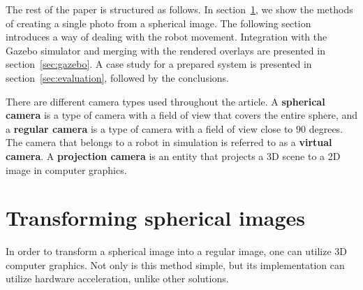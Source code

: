\documentclass{svproc}
\begin{document}
The rest of the paper is structured as follows. In section~\ref{sec:spherical}, we show the methods of creating
a single photo from a spherical image. The following section introduces a way of dealing with the robot movement.
Integration with the Gazebo simulator and merging with the rendered overlays are presented in section~\ref{sec:gazebo}.
A case study for a prepared system is presented in section~\ref{sec:evaluation}, followed by the conclusions.






There are different camera types used throughout the article. A \textbf{spherical camera} is a type of camera with a field of view that covers the entire sphere, and a \textbf{regular camera} is a type of camera with a field of view close to $90$ degrees.
The camera that belongs to a robot in simulation is referred to as a \textbf{virtual camera}.
A \textbf{projection camera} is an entity that projects a 3D scene to a 2D image in computer graphics.


\section{Transforming spherical images}
\label{sec:spherical}

In order to transform a spherical image into a regular image, one can utilize 3D computer graphics.
Not only is this method simple, but its implementation can utilize hardware acceleration, unlike other solutions. 
\end{document}
